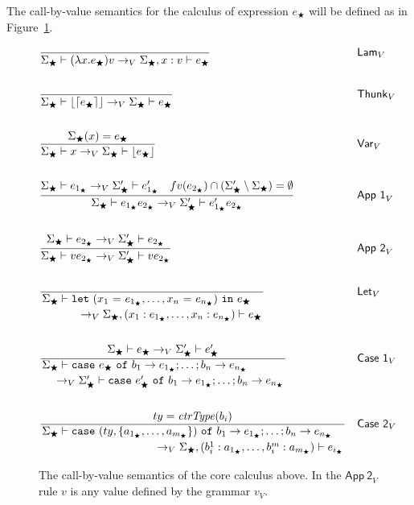 \documentclass[float=false, crop=false]{standalone}
\numberwithin{subcase}{case}
\newcommand{\tlang}{\bigstar}
\newcommand{\thunk}[1]{\lceil #1 \rceil}
\newcommand{\unwrap}[1]{\lfloor #1 \rfloor}
\newcommand{\tcbv}{\rightarrow_V}
\begin{document}
The call-by-value semantics for the calculus of expression $e_\tlang$ 
will be defined as in Figure~\ref{t:cbv}.

\begin{figure}
\begin{align*}
  &\frac{}{\Sigma_\tlang \vdash (\lambda x.e_\tlang)v \tcbv \Sigma_\tlang,x:v \vdash e_\tlang } && \mathsf{Lam}_V \\ \\
  &\frac{}{\Sigma_\tlang \vdash \unwrap{\thunk{e_\tlang}} \tcbv \Sigma_\tlang \vdash e_\tlang} 
  && \mathsf{Thunk}_V \\ \\
  &\frac{\Sigma_\tlang(x) = e_\tlang}{\Sigma_\tlang \vdash x \tcbv \Sigma_\tlang \vdash \unwrap{e_\tlang} } 
     && \mathsf{Var}_V\\ \\
  &\frac{\Sigma_\tlang \vdash   e_{1_\tlang}\tcbv \Sigma_\tlang' \vdash 
    e_{1_\tlang}' \quad fv(e_{2_\tlang}) 
    \cap (\Sigma'_\tlang \setminus \Sigma_\tlang) = 
    \emptyset }{\Sigma_\tlang \vdash e_{1_\tlang} e_{2_\tlang} \tcbv 
    \Sigma_\tlang' \vdash e_{1_\tlang}' e_{2_\tlang}} && \mathsf{App\ 1}_V\\\\
  &\frac{\Sigma_\tlang \vdash e_{2_\tlang} \tcbv \Sigma_\tlang'\vdash 
    e_{2_\tlang}}
  {\Sigma_\tlang \vdash v e_{2_\tlang} \tcbv 
    \Sigma_\tlang' \vdash v e_{2_\tlang}} && \mathsf{App\ 2}_V  \\ \\
  &\dfrac{}{\splitdfrac{\Sigma_\tlang \vdash 
\mathtt{let}\ (x_1\ \mathtt{=}\ e_{1_\tlang},\dotsc, x_n\ \mathtt{=}\
e_{n_\tlang})\ \mathtt{in}\ e_\tlang}
    {\tcbv \Sigma_\tlang,(x_1:e_{1_\tlang},\dotsc,x_n:e_{n_\tlang})
      \vdash e_\tlang}} && \mathsf{Let}_V  \\ \\
  &\dfrac{\Sigma_\tlang \vdash e_\tlang \tcbv \Sigma_\tlang' \vdash e'_\tlang}
  {\splitdfrac{\Sigma_\tlang \vdash 
  \mathtt{case}\ e_\tlang\ \mathtt{of}\ b_1 \rightarrow e_{1_\tlang}; 
  \dots; b_n \rightarrow e_{n_\tlang}}
  {\tcbv \Sigma_\tlang' \vdash\mathtt{case}\ e_\tlang'\ 
    \mathtt{of}\ b_1 \rightarrow e_{1_\tlang}; 
    \dots; b_n \rightarrow e_{n_\tlang}}} 
      && \mathsf{Case\ 1}_V \\\\
  &\dfrac{ty = \mathit{ctrType}(b_i)}{\splitdfrac{\Sigma_\tlang \vdash 
  \mathtt{case}\ (ty,\{a_{1_\tlang},\dotsc,a_{m_\tlang}\})
  \ \mathtt{of}\ b_1 \rightarrow e_{1_\tlang};
  \dots; b_n \rightarrow e_{n_\tlang}}
  {\tcbv \Sigma_\tlang,(b_i^1:a_{1_\tlang},\dotsc,b_i^m:a_{m_\tlang})
    \vdash e_{i_\tlang}}} && \mathsf{Case\ 2}_V 
\end{align*}
\caption[The call-by-value semantics of calculus$_\tlang$]{The call-by-value semantics of the core calculus above. In the 
  $\mathsf{App\ 2}_V$ rule $v$ is any value defined by the grammar $v_V$.}
\label{t:cbv}
\end{figure}
\end{document}
